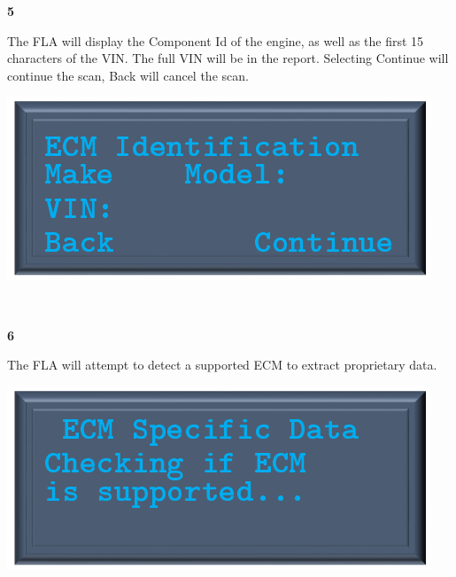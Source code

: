 \documentclass[11pt, oneside]{book}
\begin{document}
\noindent\begin{minipage}{0.45\textwidth}%
\begin{center}
\textbf{5}\\[\baselineskip]
\end{center}
The FLA will display the Component Id of the engine, as well as the first 15 characters of the VIN. The full VIN will be in the report. Selecting Continue will continue the scan, Back will cancel the scan.
\end{minipage}%
\hfill%
\begin{minipage}{0.45\textwidth}
\includegraphics[width=\linewidth]{../media/pstricks_files/15_ecm_identification}
\end{minipage}
\\[\baselineskip]
\noindent\begin{minipage}{0.45\textwidth}%
\begin{center}
\textbf{6}\\[\baselineskip]
\end{center}
The FLA will attempt to detect a supported ECM to extract proprietary data.
\end{minipage}%
\hfill%
\begin{minipage}{0.45\textwidth}
\includegraphics[width=\linewidth]{../media/pstricks_files/16_ecm_specific_checking}
\end{minipage}
\end{document}
